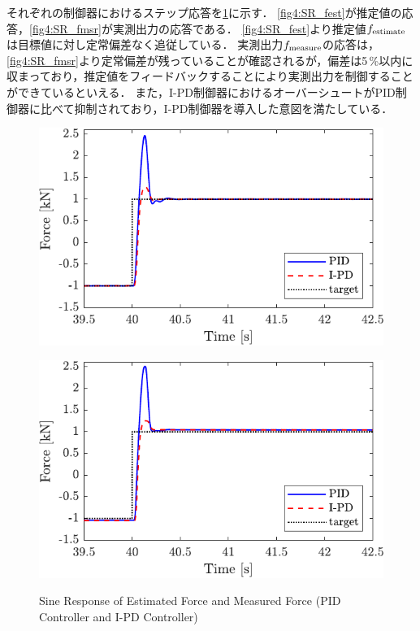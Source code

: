 それぞれの制御器におけるステップ応答を\figname\ref{fig4:SRofPIDandIPD}に示す．
\figname\ref{fig4:SR_fest}が推定値の応答，\figname\ref{fig4:SR_fmsr}が実測出力の応答である．
\figname\ref{fig4:SR_fest}より推定値$f_\mathrm{estimate}$は目標値に対し定常偏差なく追従している．
実測出力$f_\mathrm{measure}$の応答は，\figname\ref{fig4:SR_fmsr}より定常偏差が残っていることが確認されるが，偏差は5\,\%以内に収まっており，推定値をフィードバックすることにより実測出力を制御することができているといえる．
また，I-PD制御器におけるオーバーシュートがPID制御器に比べて抑制されており，I-PD制御器を導入した意図を満たしている．

\begin{figure}[tbp]
    \begin{minipage}{\minipageratio\hsize}
        \centering
        \includegraphics[keepaspectratio, scale = \minifigscale]{contents/ForceControl/figure/1115_PIDandI-PDestforce_step.pdf}
        \label{fig4:SR_fest}
    \end{minipage}
    \begin{minipage}{\minipageratio\hsize}
        \centering
        \includegraphics[keepaspectratio, scale = \minifigscale]{contents/ForceControl/figure/1115_PIDandI-PDforce_step.pdf}
        \label{fig4:SR_fmsr}
    \end{minipage}
    \caption{Sine Response of Estimated Force and Measured Force (PID Controller and I-PD Controller)}
    \label{fig4:SRofPIDandIPD}
\end{figure}


